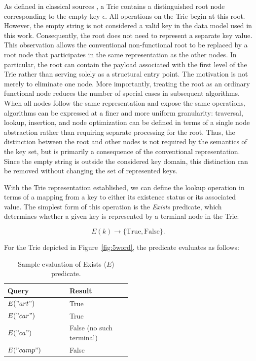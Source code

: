 \documentclass[pdflatex,sn-mathphys-num]{sn-jnl}%
\theoremstyle{thmstyleone}%
\theoremstyle{thmstyletwo}%
\theoremstyle{thmstylethree}%
\begin{document}
As defined in classical sources \cite{knuthVol3, fds_alg}, a Trie contains a
distinguished root node corresponding to the empty key $\epsilon$. All operations
on the Trie begin at this root.
However, the empty string is not considered a valid key in the
data model used in this work. Consequently, the root does not need to represent
a separate key value. This observation allows the conventional non-functional
root to be replaced by a root node that participates in the same representation as the other
nodes. In particular, the root can contain the payload associated with the first level
of the Trie rather than serving solely as a structural entry point.
The motivation is not merely to eliminate one node. More importantly, treating
the root as an ordinary functional node reduces the number of special cases in subsequent
algorithms. When all nodes follow the same representation and expose the same operations,
algorithms can be expressed at a finer and more uniform granularity: traversal, lookup,
insertion, and node optimization can be defined in terms of a single node abstraction rather than requiring
separate processing for the root. Thus, the distinction between the root and other nodes is not required
by the semantics of the key set, but is primarily a consequence of the conventional representation.
Since the empty string is outside the considered key domain, this distinction can be removed without
changing the set of represented keys.

With the Trie representation established, we can define the lookup operation in terms of a mapping
from a key to either its existence status or its associated value. The simplest form of this
operation is the \textit{Exists} predicate, which determines whether a given key is represented by a terminal
node in the Trie:

\begin{equation}
E(k) \rightarrow \{\mathrm{True},\mathrm{False}\}.
\end{equation}

For the Trie depicted in Figure~\ref{fig:5word}, the predicate evaluates as follows:

\begin{table}[htbp]

\begin{minipage}{\textwidth} %

    \caption{Sample evaluation of Exists (\(E\)) predicate.}\label{tab:queryExists}%
    \begin{tabular}{lp{0.5\linewidth} }
    \toprule
    Query & Result \\
    \midrule
    \(E("art")\) & True \\
    \(E("car")\) & True \\
    \(E("ca")\) & False (no such terminal) \\
    \(E("camp")\) & False \\
    \end{tabular}

\end{minipage}

\end{table}
\noindent
\end{document}

